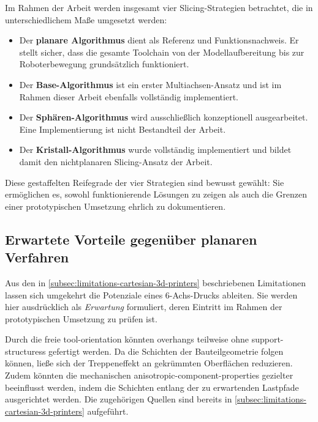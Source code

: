             Im Rahmen der Arbeit werden insgesamt vier Slicing-Strategien betrachtet, die in unterschiedlichem Maße umgesetzt werden:
            \begin{itemize}
                \item Der \textbf{planare Algorithmus} dient als Referenz und Funktionsnachweis. Er stellt sicher, dass die gesamte Toolchain von der Modellaufbereitung bis zur Roboterbewegung grundsätzlich funktioniert.
                \item Der \textbf{Base-Algorithmus} ist ein erster Multiachsen-Ansatz und ist im Rahmen dieser Arbeit ebenfalls vollständig implementiert.
                \item Der \textbf{Sphären-Algorithmus} wird ausschließlich konzeptionell ausgearbeitet. Eine Implementierung ist nicht Bestandteil der Arbeit.
                \item Der \textbf{Kristall-Algorithmus} wurde vollständig implementiert und bildet damit den nichtplanaren Slicing-Ansatz der Arbeit.
            \end{itemize}
            Diese gestaffelten Reifegrade der vier Strategien sind bewusst gewählt: Sie ermöglichen es, sowohl funktionierende Lösungen zu zeigen als auch die Grenzen einer prototypischen Umsetzung ehrlich zu dokumentieren.

        \subsection{Erwartete Vorteile gegenüber planaren Verfahren}\label{subsec:expected-benefits-over-established-approaches}
            Aus den in \cref{subsec:limitations-cartesian-3d-printers} beschriebenen Limitationen lassen sich umgekehrt die Potenziale eines 6-Achs-Drucks ableiten.
            Sie werden hier ausdrücklich als \emph{Erwartung} formuliert, deren Eintritt im Rahmen der prototypischen Umsetzung zu prüfen ist.

            Durch die freie \gls{tool-orientation} könnten \glspl{overhang} teilweise ohne \glspl{support-structures} gefertigt werden.
            Da die Schichten der Bauteilgeometrie folgen können, ließe sich der Treppeneffekt an gekrümmten Oberflächen reduzieren.
            Zudem könnten die mechanischen \gls{anisotropic-component-properties} gezielter beeinflusst werden, indem die Schichten entlang der zu erwartenden Lastpfade ausgerichtet werden.
            Die zugehörigen Quellen sind bereits in \cref{subsec:limitations-cartesian-3d-printers} aufgeführt.

